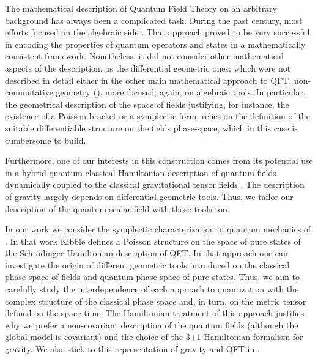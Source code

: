 \documentclass{elsarticle}%
\begin{document}
The mathematical description of Quantum Field Theory on an arbitrary background has always been a complicated task. During the past century, most efforts focused on the algebraic side \cite{haagAlgebraicApproach1964, streaterPCTSpin1989,doplicherFieldsObservables1969a,doplicherFieldsObservables1969,doplicherLocalObservables1971,doplicherLocalObservables1974,buchholzLocalityStructure1982,buchholzAlgebraicApproach2020,brunettiAdvancesAlgebraic2015}. That approach proved to be very successful in encoding the properties of quantum operators and states in a mathematically consistent framework. Nonetheless, it did not consider other mathematical aspects of the description, as  the differential geometric ones; which were not described in detail either in the other main mathematical approach to QFT, non-commutative geometry (\cite{connesNoncommutativeGeometry1995,connesRenormalizationQuantum2000}), more focused, again, on algebraic tools.   In particular, the geometrical description of the space of fields justifying, for instance, the existence of a Poisson bracket or  a symplectic form, relies on the definition of the suitable differentiable structure on the fields phase-space, which in this case is cumbersome to build. 

 Furthermore, one of our interests in this construction comes from its potential use in a hybrid quantum-classical Hamiltonian description of quantum fields dynamically coupled to the classical gravitational tensor fields \cite{alonsobujHybridGeometrodynamics2024}. The description of gravity largely depends on differential geometric tools. Thus, we tailor our  description of  the quantum scalar field  with those tools too.
 
 
 In our work we consider the symplectic characterization of quantum mechanics of \cite{kibbleGeometrizationQuantum1979}. In that work Kibble defines a Poisson structure on the space of pure states of the Schrödinger-Hamiltonian description of  QFT. In that approach one can investigate the origin of different geometric tools  introduced on the classical phase space of fields and quantum phase space of pure states. Thus, we  aim to carefully study the interdependence of each approach to quantization with the complex structure of the classical phase space and, in turn, on the metric tensor defined on the space-time.  The Hamiltonian treatment of this approach justifies why we prefer  a non-covariant description of the quantum fields (although the global model is covariant) and the choice of the 3+1 Hamiltonian formalism for  gravity. We also stick to this representation of gravity and QFT in \cite{alonsobujHybridGeometrodynamics2024}.
       
\end{document}
